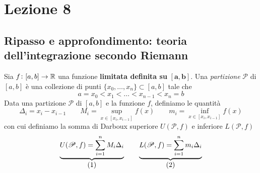 \section{Lezione 8}
\subsection{Ripasso e approfondimento: teoria dell'integrazione secondo Riemann}
\begin{definition}
    \label{def:8.1}
    Sia $f\colon[a,b]\to\amsbb{R}$ una funzione \textbf{limitata definita su} $\mathbf{[a,b]}$. Una \emph{partizione} $\mathscr{P}$ di $[a,b]$ è una collezione di punti $\{x_0, \dots, x_n\}\subset [a,b]$ tale che
    \[
    a=x_0 < x_1 < \dots < x_{n-1}<x_n= b
    \]
    Data una partizione $\mathscr{P}$ di $[a,b]$ e la funzione $f$, definiamo le quantità
    \begin{equation}
        \label{eq:8.1}
        \Delta_i = x_i - x_{i-1} \qquad M_i = \sup_{x\in[x_i, x_{i-1}]} f(x) \qquad m_i = \inf_{x\in[x_i, x_{i-1}]} f(x)
    \end{equation}
    con cui definiamo la somma di Darboux superiore $U(\mathscr{P}, f)$ e inferiore $L(\mathscr{P},f)$
    \[
    \underbrace{U(\mathscr{P},f) = \sum_{i=1}^n M_i \Delta_i}_{\stepcounter{equation}\mbox{(\theequation)}} \qquad \underbrace{L(\mathscr{P},f) = \sum_{i=1}^n m_i \Delta_i}_{\stepcounter{equation}\mbox{(\theequation)}}
    \]
    \addtocounter{equation}{-2}\label{eq:8.2}
    \addtocounter{equation}{0}\label{eq:8.3}
\end{definition}
